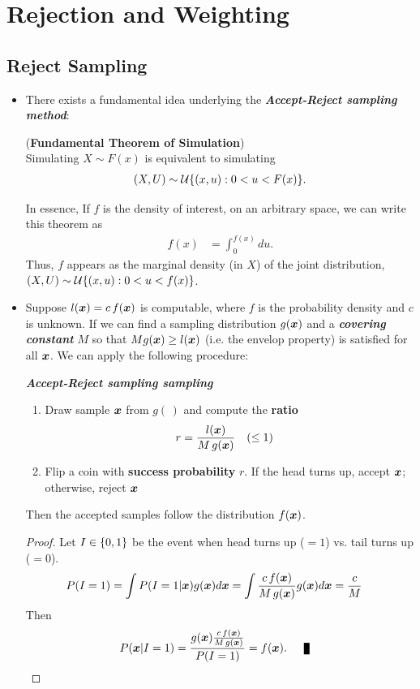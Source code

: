 \documentclass[11pt]{article}
\begin{document}
\section{Rejection and Weighting}
\subsection{Reject Sampling}
\begin{itemize}
\item There exists a fundamental idea underlying the \emph{\textbf{Accept-Reject sampling method}}:
\begin{theorem} (\textbf{Fundamental Theorem of Simulation}) \citep{robert1999monte}\\
Simulating $X \sim F(x)$ is equivalent to simulating
\begin{align*}
(X,U) \sim {\mathcal U}\{(x,u): 0 < u < F(x)\}.
\end{align*}
\end{theorem} 

In essence, If $f$ is the density of interest, on an arbitrary space, we can write this theorem as 
\begin{align*}
f(x) &= \int_{0}^{f(x)} d u.
\end{align*} Thus, $f$ appears as the marginal density (in $X$) of the joint distribution, $(X,U) \sim {\mathcal U}\{(x,u): 0 < u < f(x)\}$.

\item  Suppose $l(\boldsymbol{x}) = c\,f(\boldsymbol{x})$ is computable, where $f$ is the probability density and $c$ is unknown. If we can find a sampling distribution $g(\boldsymbol{x})$ and a \emph{\textbf{covering constant}} $M$ so that $M g(\boldsymbol{x}) \ge l(\boldsymbol{x})$ (i.e. the envelop property) is satisfied for all $\boldsymbol{x}$. We can apply the following procedure:

\emph{\textbf{Accept-Reject sampling sampling}} \citep{liu2001monte}
\begin{enumerate}
\item Draw sample $\boldsymbol{x}$ from $g(\,)$ and compute the \textbf{ratio}
\begin{align*}
r &= \frac{l(\boldsymbol{x})}{M\,g(\boldsymbol{x})}\quad (\le 1)
\end{align*}
\item Flip a coin with \textbf{success probability} $r$. If the head turns up, accept $\boldsymbol{x}$; otherwise, reject $\boldsymbol{x}$
\end{enumerate} 
Then the accepted samples follow the distribution $f(\boldsymbol{x})$.
\begin{proof}
Let $I\in \left\{0, 1\right\}$ be the event when head turns up ($=1$) vs. tail turns up ($=0$). 
\begin{align*}
P(I=1) &= \int P(I=1 | \boldsymbol{x}) g(\boldsymbol{x}) d\boldsymbol{x} = \int \frac{c\, f(\boldsymbol{x})}{M\,g(\boldsymbol{x})}g(\boldsymbol{x}) d\boldsymbol{x} = \frac{c}{M}
\end{align*}
Then 
\begin{align*}
P(\mb{x} | I=1) &= \frac{g(\mb{x}) \frac{c\, f(\mb{x})}{M\,g(\mb{x})} }{P(I=1)} = f(\mb{x}). \qed
\end{align*}
\end{proof}


\end{itemize}
\end{document}
